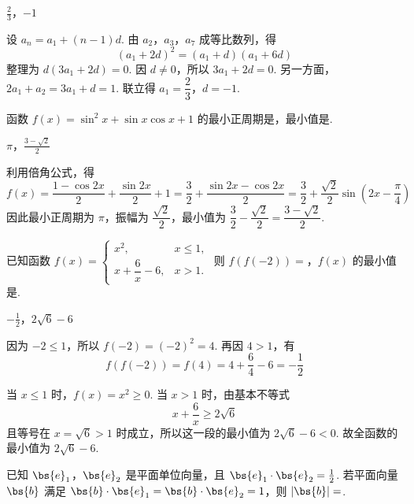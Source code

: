 \begin{answer}
\(\frac{2}{3}\)，\(-1\)
\end{answer}

\begin{solution}
设 \(a_n=a_1+(n-1)d\). 由 \(a_2\)，\(a_3\)，\(a_7\) 成等比数列，得
\[
(a_1+2d)^2=(a_1+d)(a_1+6d)
\]
整理为 \(d(3a_1+2d)=0\). 因 \(d\neq0\)，所以 \(3a_1+2d=0\). 另一方面，\(2a_1+a_2=3a_1+d=1\). 联立得 \(a_1=\dfrac23\)，\(d=-1\).
\end{solution}

\begin{problem}
函数 \(f(x)=\sin^2x+\sin x\cos x+1\) 的最小正周期是\fillinblank{}，最小值是\fillinblank{}.
\end{problem}

\begin{answer}
\(\pi\)，\(\frac{3-\sqrt{2}}{2}\)
\end{answer}

\begin{solution}
利用倍角公式，得
\[
f(x)=\frac{1-\cos2x}{2}+\frac{\sin2x}{2}+1=\frac32+\frac{\sin2x-\cos2x}{2}=\frac32+\frac{\sqrt2}{2}\sin\left(2x-\frac\pi4\right)
\]
因此最小正周期为 \(\pi\)，振幅为 \(\dfrac{\sqrt2}{2}\)，最小值为 \(\dfrac32-\dfrac{\sqrt2}{2}=\dfrac{3-\sqrt2}{2}\).
\end{solution}

\begin{problem}
已知函数 \(f(x)=\begin{cases}
x^2,&x\leqslant1,\\
x+\dfrac{6}{x}-6,&x>1.
\end{cases}\) 则 \(f(f(-2))=\)\fillinblank{}，\(f(x)\) 的最小值是\fillinblank{}.
\end{problem}

\begin{answer}
\(-\frac{1}{2}\)，\(2\sqrt{6}-6\)
\end{answer}

\begin{solution}
因为 \(-2\leqslant1\)，所以 \(f(-2)=(-2)^2=4\). 再因 \(4>1\)，有
\[
f(f(-2))=f(4)=4+\frac64-6=-\frac12
\]

当 \(x\leqslant1\) 时，\(f(x)=x^2\geqslant0\). 当 \(x>1\) 时，由基本不等式
\[
x+\frac6x\geqslant2\sqrt6
\]
且等号在 \(x=\sqrt6>1\) 时成立，所以这一段的最小值为 \(2\sqrt6-6<0\). 故全函数的最小值为 \(2\sqrt6-6\).
\end{solution}

\begin{problem}
已知 \(\bs{e}_1\)，\(\bs{e}_2\) 是平面单位向量，且 \(\bs{e}_1\cdot\bs{e}_2=\frac12\). 若平面向量 \(\bs{b}\) 满足 \(\bs{b}\cdot\bs{e}_1=\bs{b}\cdot\bs{e}_2=1\)，则 \(|\bs{b}|=\)\fillinblank{}.
\end{problem}

